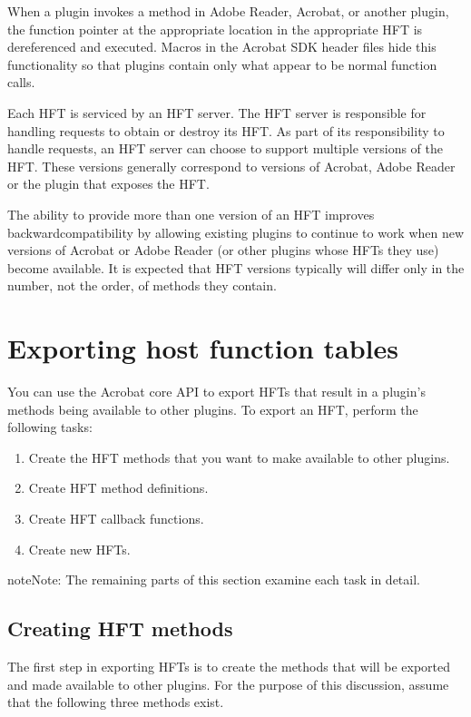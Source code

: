 \documentclass[letterpaper,12pt,english,openany,oneside]{sphinxmanual}
\begin{document}
When a plugin invokes a method in Adobe Reader, Acrobat, or another plugin, the function pointer at the appropriate location in the appropriate HFT is dereferenced and executed. Macros in the Acrobat SDK header files hide this functionality so that plugins contain only what appear to be normal function calls.

Each HFT is serviced by an HFT server. The HFT server is responsible for handling requests to obtain or destroy its HFT. As part of its responsibility to handle requests, an HFT server can choose to support multiple versions of the HFT. These versions generally correspond to versions of Acrobat, Adobe Reader or the plugin that exposes the HFT.

The ability to provide more than one version of an HFT improves backward\sphinxhyphen{}compatibility by allowing existing plugins to continue to work when new versions of Acrobat or Adobe Reader (or other plugins whose HFTs they use) become available. It is expected that HFT versions typically will differ only in the number, not the order, of methods they contain.


\section{Exporting host function tables}
\label{\detokenize{Plugins_Hft:exporting-host-function-tables}}
You can use the Acrobat core API to export HFTs that result in a plugin’s methods being available to other plugins. To export an HFT, perform the following tasks:
\begin{enumerate}
%
\item {} 
Create the HFT methods that you want to make available to other plugins.

\item {} 
Create HFT method definitions.

\item {} 
Create HFT callback functions.

\item {} 
Create new HFTs.

\end{enumerate}

\begin{sphinxadmonition}{note}{Note:}
The remaining parts of this section examine each task in detail.
\end{sphinxadmonition}


\subsection{Creating HFT methods}
\label{\detokenize{Plugins_Hft:creating-hft-methods}}
The first step in exporting HFTs is to create the methods that will be exported and made available to other plugins. For the purpose of this discussion, assume that the following three methods exist.
\end{document}
